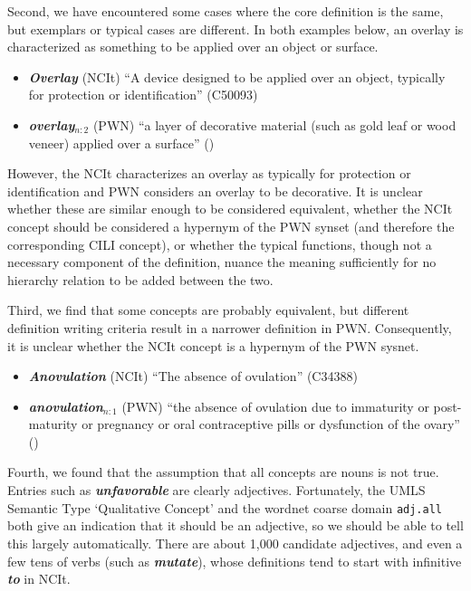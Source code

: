 \documentclass[11pt]{article}
\newcommand{\lex}[1]{\textbf{\textit{#1}}}
\begin{document}
Second, we have encountered some cases where the core definition is the same, but exemplars or typical cases are different. In both examples below, an overlay is characterized as something to be applied over an object or surface. 
\begin{itemize}
\item \lex{Overlay} (NCIt)  ``A device designed to be applied over an object, typically for protection or identification'' (C50093)
\item \lex{overlay}$_{n:2}$ (PWN)
``a layer of decorative material (such as gold leaf or wood veneer) applied over a surface'' () %
\end{itemize}
However, the NCIt characterizes an overlay as typically for protection or identification and PWN considers an overlay to be decorative. It is unclear whether these are similar enough to be considered equivalent, whether the NCIt concept should be considered a hypernym of the PWN synset (and therefore the corresponding CILI concept), or whether the typical functions, though not a necessary component of the definition, nuance the meaning sufficiently for no hierarchy relation to be added between the two.

Third, we find that some concepts are probably equivalent, but different definition writing criteria result in a narrower definition in PWN. %
Consequently, it is unclear whether the NCIt concept is a hypernym of the PWN sysnet.
\begin{itemize}
\item \lex{Anovulation} (NCIt) ``The absence of ovulation'' (C34388)
\item \lex{anovulation}$_{n:1}$ (PWN)
``the absence of ovulation due to immaturity or post-maturity or pregnancy or oral contraceptive pills or dysfunction of the ovary'' ()
\end{itemize}

Fourth, we found that the assumption that all concepts are nouns is
not true.  Entries such as \lex{unfavorable} are clearly adjectives.
Fortunately, the UMLS Semantic Type `Qualitative Concept' and the
wordnet coarse domain \texttt{adj.all} both give an indication that it
should be an adjective, so we should be able to tell this largely
automatically.  There are about 1,000 candidate adjectives, and even a
few tens of verbs (such as \lex{mutate}), whose definitions tend to start with
infinitive \lex{to} in NCIt.
\end{document}
